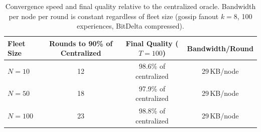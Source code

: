 \begin{table}[H]
\centering
\begin{tabular}{lccc}
\toprule
Fleet Size & Rounds to 90\% of Centralized & Final Quality ($T=100$) & Bandwidth/Round \\
\midrule
$N=10$ & 12 & 98.6\% of centralized & 29\,KB/node \\
$N=50$ & 18 & 97.9\% of centralized & 29\,KB/node \\
$N=100$ & 23 & 98.8\% of centralized & 29\,KB/node \\
\bottomrule
\end{tabular}
\caption{Convergence speed and final quality relative to the centralized oracle.
Bandwidth per node per round is constant regardless of fleet size (gossip fanout
$k=8$, 100 experiences, BitDelta compressed).}
\label{tab:convergence}
\end{table}

